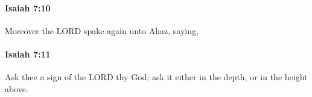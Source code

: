 		\paragraph{Isaiah 7:10} %
			\label{ISAIAH-7-10}

			Moreover the LORD spake again unto Ahaz, saying,


		\paragraph{Isaiah 7:11} %
			\label{ISAIAH-7-11}

			Ask thee a sign of the LORD thy God; ask it either in the depth, or in the height above.


